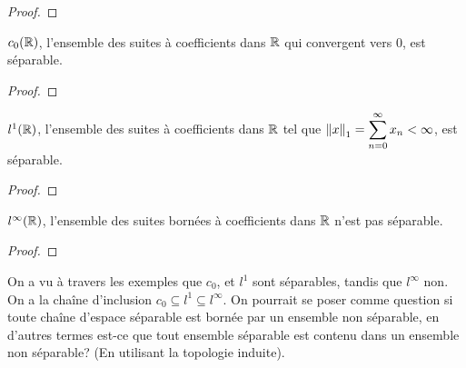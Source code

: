 \begin{proof}

\end{proof}

\begin{proposition}
	$c_{0}(\mathbb{R})$, l'ensemble des suites à coefficients dans $\mathbb{R}$
	qui convergent vers 0, est séparable.
\end{proposition}

\begin{proof}

\end{proof}

\begin{proposition}
	$l^{1}(\mathbb{R})$, l'ensemble des suites à coefficients dans $\mathbb{R}$
	tel que $\norm{x}_{1} = \displaystyle \sum_{n = 0}^{\infty} x_{n} < \infty$, est
	séparable.
\end{proposition}

\begin{proof}

\end{proof}

\begin{proposition}
	$l^{\infty}(\mathbb{R})$, l'ensemble des suites bornées à coefficients dans
	$\mathbb{R}$ n'est pas séparable.
\end{proposition}

\begin{proof}

\end{proof}

\begin{question}
	On a vu à travers les exemples que $c_{0}$, et $l^{1}$ sont séparables,
	tandis que $l^{\infty}$ non. On a la chaîne d'inclusion $c_{0} \subseteq
	l^{1} \subseteq l^{\infty}$.
	On pourrait se poser comme question si toute chaîne d'espace séparable
	est bornée par un ensemble non séparable, en d'autres termes est-ce que tout
	ensemble séparable est contenu dans un ensemble non séparable? (En
	utilisant la topologie induite).
\end{question}
